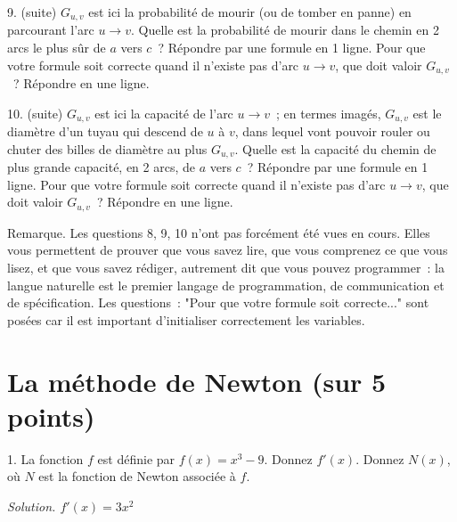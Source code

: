 \documentclass[11pt]{article}
\begin{document}
\else\fi

 
9. (suite) $G_{u,v}$ est ici   la probabilité de mourir (ou de tomber en panne) en parcourant l'arc
$u\rightarrow v$. Quelle est la probabilité de mourir dans le chemin en 2 arcs le plus sûr  de $a$ vers $c$~? Répondre par une formule en 1 ligne.
Pour que votre formule soit correcte quand il n'existe pas d'arc $u\rightarrow v$, 
que doit valoir $G_{u,v}$~?
Répondre en une ligne.

\else\fi
 

10. (suite)  $G_{u,v}$ est  ici la capacité de l'arc $u\rightarrow v$~; en termes imagés,
$G_{u,v}$ est le diamètre d'un tuyau qui descend de $u$ à $v$, dans lequel vont pouvoir rouler ou chuter  des billes de diamètre au plus $G_{u,v}$.
Quelle est la capacité du chemin de plus grande capacité,
en 2 arcs, de $a$ vers $c$~?
Répondre par une formule en 1 ligne.
Pour que votre formule soit correcte quand il n'existe pas d'arc $u\rightarrow v$, 
que doit valoir $G_{u,v}$~?
Répondre en une ligne.

\else\fi


Remarque. Les questions 8, 9, 10 n'ont pas forcément été vues en cours. Elles
vous permettent de prouver que vous savez lire, que vous comprenez ce que vous lisez, et que vous savez rédiger, autrement dit
que vous pouvez  programmer~: la  langue naturelle est le premier langage de programmation, de communication et de spécification.
Les questions~: "Pour que votre formule soit correcte..." sont posées 
car il est important d’initialiser correctement les variables.



\section{La méthode de Newton (sur 5 points)}
 
1. La fonction $f$ est définie par $f(x)=x^3-9$. Donnez $f'(x)$.
Donnez  $N(x)$, où $N$ est la fonction de Newton associée à $f$.
 
\ifcorrige
{\it Solution. $f'(x)=3x^2$ }
\else\fi
\end{document}
